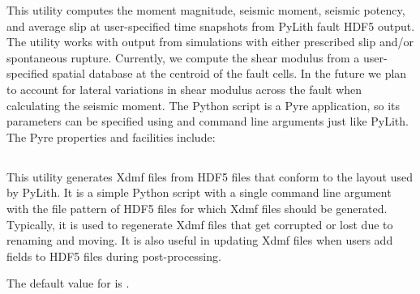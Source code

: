 This utility computes the moment magnitude, seismic moment, seismic
potency, and average slip at user-specified time snapshots from PyLith
fault HDF5 output. The utility works with output from simulations
with either prescribed slip and/or spontaneous rupture. Currently,
we compute the shear modulus from a user-specified spatial database
at the centroid of the fault cells. In the future we plan to account
for lateral variations in shear modulus across the fault when calculating
the seismic moment. The Python script is a Pyre application, so its
parameters can be specified using  and command line arguments
just like PyLith. The Pyre properties and facilities include:
\begin{inventory}
\end{inventory}

\subsection{}
\label{sec:pylith:genxdmf}

This utility generates Xdmf files from HDF5 files that conform to the
layout used by PyLith. It is a simple Python script with a single
command line argument with the file pattern of HDF5 files for which
Xdmf files should be generated. Typically, it is used to regenerate
Xdmf files that get corrupted or lost due to renaming and moving. It
is also useful in updating Xdmf files when users add fields to HDF5
files during post-processing.
The default value for  is .



